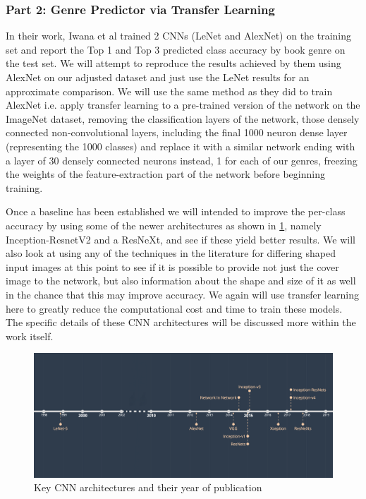 \documentclass[12pt]{article}
\numberwithin{equation}{section}
\numberwithin{figure}{section}
\begin{document}
\subsubsection{Part 2: Genre Predictor via Transfer Learning} %
\label{sub:part_1_genre_predictor}
In their work, Iwana et al\cite{KenjiIwana} trained 2 CNNs (LeNet and AlexNet) on the training set and report the Top 1 and Top 3 predicted class accuracy by book genre on the test set. We will attempt to reproduce the results achieved by them using AlexNet on our adjusted dataset and just use the LeNet results for an approximate comparison. We will use the same method as they did to train AlexNet i.e. apply transfer learning to a pre-trained version of the network on the ImageNet dataset, removing the classification layers of the network, those densely connected non-convolutional layers, including the  final 1000 neuron dense layer (representing the 1000 classes) and replace it with a similar network ending with a layer of 30 densely connected neurons instead, 1 for each of our genres, freezing the weights of the feature-extraction part of the network before beginning training.

Once a baseline has been established we will intended to improve the per-class accuracy by using some of the newer architectures as shown in \cref{fig:cnn_history}, namely Inception-ResnetV2 and a ResNeXt, and see if these yield better results. We will also look at using any of the techniques in the literature for differing shaped input images at this point to see if it is possible to provide not just the cover image to the network, but also information about the shape and size of it as well in the chance that this may improve accuracy. We again will use transfer learning here to greatly reduce the computational cost and time to train these models. The specific details of these CNN architectures will be discussed more within the work itself. 

\begin{figure}
	\centering
	\captionsetup{justification=centering,margin=2cm}
	\includegraphics[scale=0.22]{CNN_HISTORY.png}
	\caption{Key CNN architectures and their year of publication\cite{Karim2019}}
	\label{fig:cnn_history}
\end{figure}
\end{document}
